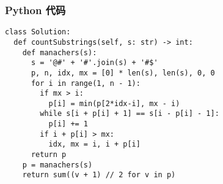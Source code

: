 \subsubsection{Python 代码}

\begin{verbatim}
class Solution:
  def countSubstrings(self, s: str) -> int:
    def manachers(s):
      s = '@#' + '#'.join(s) + '#$'
      p, n, idx, mx = [0] * len(s), len(s), 0, 0
      for i in range(1, n - 1):
        if mx > i:
          p[i] = min(p[2*idx-i], mx - i)
        while s[i + p[i] + 1] == s[i - p[i] - 1]:
          p[i] += 1
        if i + p[i] > mx:
          idx, mx = i, i + p[i]
      return p
    p = manachers(s)
    return sum((v + 1) // 2 for v in p)
\end{verbatim}

